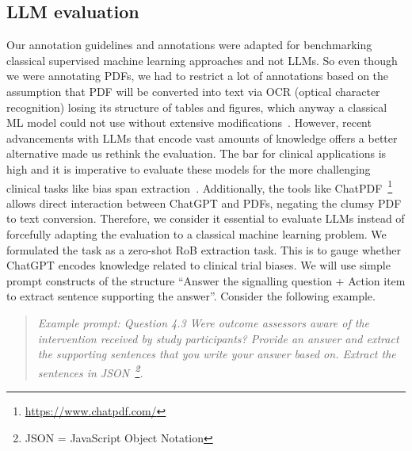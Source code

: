 \documentclass[sn-mathphys,Numbered]{sn-jnl}%
\theoremstyle{thmstyleone}%
\theoremstyle{thmstyletwo}%
\theoremstyle{thmstylethree}%
\begin{document}
\subsection{LLM evaluation}
\label{method:llm}
%
Our annotation guidelines and annotations were adapted for benchmarking classical supervised machine learning approaches and not LLMs.
So even though we were annotating PDFs, we had to restrict a lot of annotations based on the assumption that PDF will be converted into text via OCR (optical character recognition) losing its structure of tables and figures, which anyway a classical ML model could not use without extensive modifications~\cite{li2019figure,li2023uttsr}.
However, recent advancements with LLMs that encode vast amounts of knowledge offers a better alternative made us rethink the evaluation.
The bar for clinical applications is high and it is imperative to evaluate these models for the more challenging clinical tasks like bias span extraction~\cite{singhal2023large}.
Additionally, the tools like ChatPDF~\footnote{\url{https://www.chatpdf.com/}} allows direct interaction between ChatGPT and PDFs, negating the clumsy PDF to text conversion.
Therefore, we consider it essential to evaluate LLMs instead of forcefully adapting the evaluation to a classical machine learning problem.
We formulated the task as a zero-shot RoB extraction task.
This is to gauge whether ChatGPT encodes knowledge related to clinical trial biases.
We will use simple prompt constructs of the structure ``Answer the signalling question + Action item to extract sentence supporting the answer''. Consider the following example.

\begin{quote}
\itshape Example prompt: Question 4.3 Were outcome assessors aware of the intervention received by study participants? Provide an answer and extract the supporting sentences that you write your answer based on. Extract the sentences in JSON~\footnote{JSON = JavaScript Object Notation}.
\end{quote}
\end{document}
